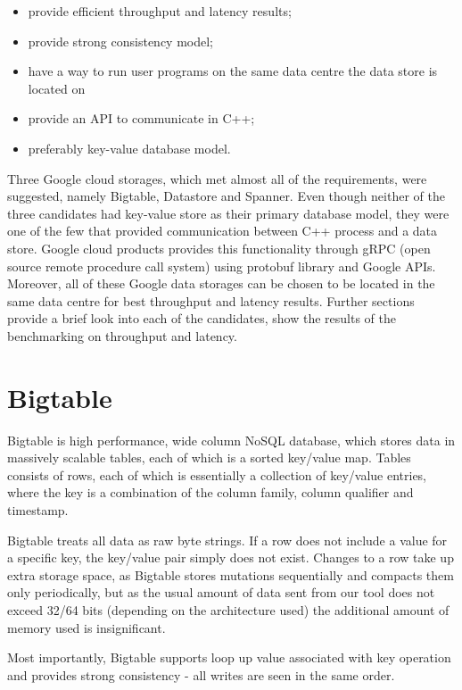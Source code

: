\documentclass[bsc,frontabs,twoside,singlespacing,parskip,deptreport]{infthesis}     %
\begin{document}
\begin{itemize}
\item
provide efficient throughput and latency results;
\item
provide strong consistency model;
\item
have a way to run user programs on the same data centre the data store is located on
\item
provide an API to communicate in C++;
\item
preferably key-value database model.
\end{itemize}

Three Google cloud storages, which met almost all of the requirements, were suggested, namely Bigtable, Datastore and Spanner. Even though neither of the three candidates had key-value store as their primary database model, they were one of the few that provided communication between C++ process and a data store. Google cloud products provides this functionality through gRPC (open source remote procedure call system) using protobuf library and Google APIs. Moreover, all of these Google data storages can be chosen to be located in the same data centre for best throughput and latency results. Further sections provide a brief look into each of the candidates, show the results of the benchmarking on throughput and latency.


\section{Bigtable}

Bigtable is high performance, wide column NoSQL database, which stores data in massively scalable tables, each of which is a sorted key/value map. Tables consists of rows, each of which is essentially a collection of key/value entries, where the key is a combination of the column family, column qualifier and timestamp. 

Bigtable treats all data as raw byte strings. If a row does not include a value for a specific key, the key/value pair simply does not exist. Changes to a row take up extra storage space, as Bigtable stores mutations sequentially and compacts them only periodically, but as the usual amount of data sent from our tool does not exceed 32/64 bits (depending on the architecture used) the additional amount of memory used is insignificant. 

Most importantly, Bigtable supports loop up value associated with key operation and provides strong consistency - all writes are seen in the same order.
\end{document}
